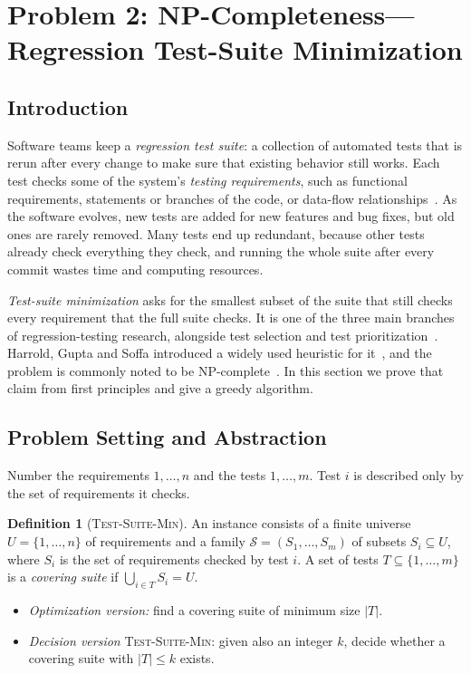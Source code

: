 \documentclass[conference]{IEEEtran}
\theoremstyle{definition}
\newtheorem{definition}{Definition}
\theoremstyle{remark}
\newcommand{\TSM}{\textsc{Test-Suite-Min}}
\begin{document}
\section{Problem 2: NP-Completeness---Regression Test-Suite Minimization}
\label{sec:p2}

\subsection{Introduction}
\label{sec:p2-intro}
Software teams keep a \emph{regression test suite}: a collection of automated
tests that is rerun after every change to make sure that existing behavior
still works. Each test checks some of the system's \emph{testing
requirements}, such as functional requirements, statements or branches of the
code, or data-flow relationships~\cite{harrold1993}. As the software evolves,
new tests are added for new features and bug fixes, but old ones are rarely
removed. Many tests end up redundant, because other tests already check
everything they check, and running the whole suite after every commit wastes
time and computing resources.

\emph{Test-suite minimization} asks for the smallest subset of the suite that
still checks every requirement that the full suite checks. It is one of the
three main branches of regression-testing research, alongside test selection
and test prioritization~\cite{yoo2012}. Harrold, Gupta and Soffa introduced a
widely used heuristic for it~\cite{harrold1993}, and the problem is commonly
noted to be NP-complete~\cite{yoo2012}. In this section we prove
that claim from first principles and give a greedy algorithm.

\subsection{Problem Setting and Abstraction}
Number the requirements $1,\dots,n$ and the tests $1,\dots,m$. Test $i$ is
described only by the set of requirements it checks.

\begin{definition}[\TSM{}]
An instance consists of a finite universe $U = \{1,\dots,n\}$ of requirements
and a family $\mathcal{S} = (S_1,\dots,S_m)$ of subsets $S_i \subseteq U$,
where $S_i$ is the set of requirements checked by test $i$. A set of tests
$T \subseteq \{1,\dots,m\}$ is a \emph{covering suite} if
$\bigcup_{i\in T} S_i = U$.
\begin{itemize}
  \item \emph{Optimization version:} find a covering suite of minimum size $|T|$.
  \item \emph{Decision version} \TSM{}: given also an integer $k$, decide
        whether a covering suite with $|T| \le k$ exists.
\end{itemize}
\end{definition}
\end{document}
